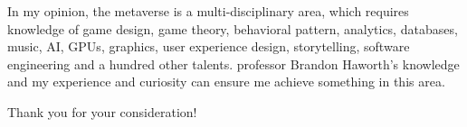 \documentclass[12pt]{article}
\begin{document}
\bigskip

In my opinion, the metaverse is a multi-disciplinary area, which requires knowledge of game design, game theory, behavioral pattern, analytics, databases, music, AI, GPUs, graphics, user experience design, storytelling, software engineering and a hundred other talents. professor Brandon Haworth's knowledge and my experience and curiosity can ensure me achieve something in this area.

\bigskip

Thank you for your consideration!
\end{document}
